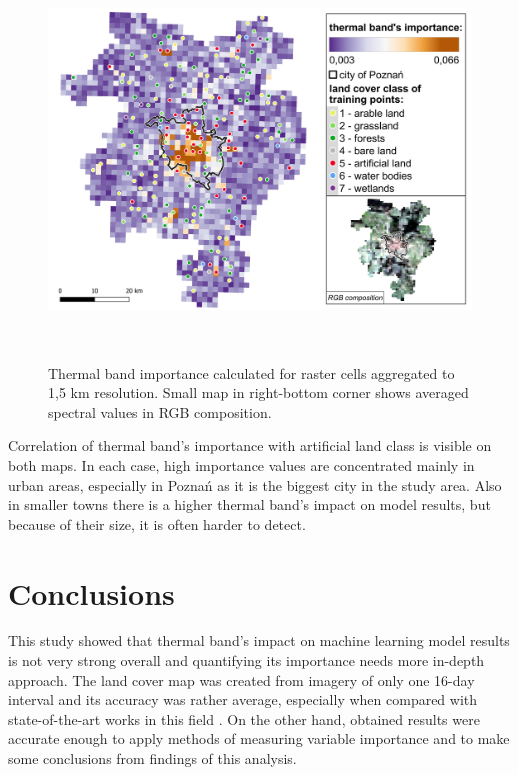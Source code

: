 \documentclass{amuthesis}
\begin{document}
\begin{figure}[H]

{\centering \includegraphics[width=5.875in,height=4.16667in]{./figures/B10_importance-spatial-ENG2.png}

}

\caption{\label{fig-rycina18}Thermal band importance calculated for
raster cells aggregated to 1,5 km resolution. Small map in right-bottom
corner shows averaged spectral values in RGB composition.}

\end{figure}

Correlation of thermal band's importance with artificial land class is
visible on both maps. In each case, high importance values are
concentrated mainly in urban areas, especially in Poznań as it is the
biggest city in the study area. Also in smaller towns there is a higher
thermal band's impact on model results, but because of their size, it is
often harder to detect.


\hypertarget{conclusion}{%
\chapter{Conclusions}\label{conclusion}}

This study showed that thermal band's impact on machine learning model
results is not very strong overall and quantifying its importance needs
more in-depth approach. The land cover map was created from imagery of
only one 16-day interval and its accuracy was rather average, especially
when compared with state-of-the-art works in this field
\autocite{malinowski_automated_2020,witjes_spatiotemporal_2021}. On the
other hand, obtained results were accurate enough to apply methods of
measuring variable importance and to make some conclusions from findings
of this analysis.
\end{document}

